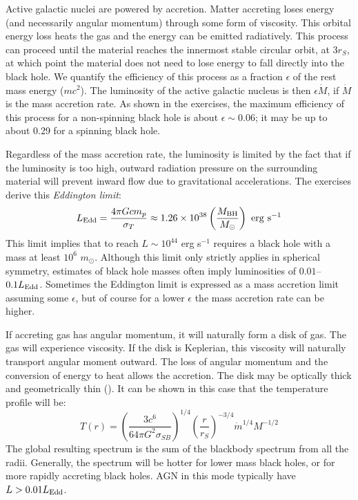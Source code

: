 Active galactic nuclei are powered by accretion. Matter accreting
loses energy (and necessarily angular momentum) through some form of
viscosity. This orbital energy loss heats the gas and the energy can
be emitted radiatively. This process can proceed until the material
reaches the innermost stable circular orbit, at $3r_S$, at which point
the material does not need to lose energy to fall directly into the
black hole. We quantify the efficiency of this process as a fraction
$\epsilon$ of the rest mass energy ($mc^2$). The luminosity of the
active galactic nucleus is then $\epsilon \dot M$, if $\dot M$ is the
mass accretion rate. As shown in the exercises, the maximum efficiency
of this process for a non-spinning black hole is about $\epsilon \sim
0.06$; it may be up to about 0.29 for a spinning black hole.

Regardless of the mass accretion rate, the luminosity is limited by
the fact that if the luminosity is too high, outward radiation
pressure on the surrounding material will prevent inward flow due to
gravitational accelerations. The exercises derive this {\it Eddington
  limit}:
\begin{equation}
L_{\rm Edd} = \frac{4\pi G c m_p}{\sigma_T} \approx 1.26 \times
10^{38} \left(\frac{M_{\rm BH}}{M_\odot}\right) \mathrm{~erg~s}^{-1}
\end{equation}
This limit implies that to reach $L\sim 10^{44}$ erg s$^{-1}$ requires
a black hole with a mass at least $10^6$ $m_\odot$. Although this
limit only strictly applies in spherical symmetry, estimates of black
hole masses often imply luminosities of $0.01$--$0.1 L_{\rm
Edd}$. Sometimes the Eddington limit is expressed as a mass accretion
limit assuming some $\epsilon$, but of course for a lower $\epsilon$
the mass accretion rate can be higher.

If accreting gas has angular momentum, it will naturally form a disk
of gas. The gas will experience viscosity. If the disk is Keplerian,
this viscosity will naturally transport angular moment outward. The
loss of angular momentum and the conversion of energy to heat allows
the accretion. The disk may be optically thick and geometrically thin
(\citealt{shakura73a}). It can be shown in this case that the
temperature profile will be:
\begin{equation}
  T(r) = \left(\frac{3 c^6}{64\pi G^2 \sigma_{SB}}\right)^{1/4}
    \left(\frac{r}{r_S}\right)^{-3/4} {\dot m}^{1/4} M^{-1/2}
\end{equation}
The global resulting spectrum is the sum of the blackbody spectrum
from all the radii. Generally, the spectrum will be hotter for lower
mass black holes, or for more rapidly accreting black holes. AGN in
this mode typically have $L>0.01 L_{\rm Edd}$.

